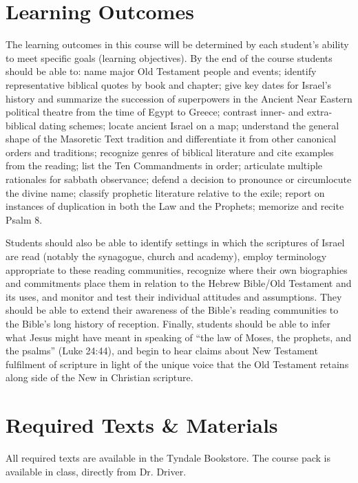 \documentclass[titlepage]{article}
\newcommand\incl{../includes}
\begin{document}


\section{Learning Outcomes}
\label{outcomes}

The learning outcomes in this course will be determined by each
student's ability to meet specific goals (learning objectives). By the
end of the course students should be able to:
  name major Old Testament people and events;
  identify representative biblical quotes by book and chapter;
  give key dates for Israel's history and summarize the succession of
    superpowers in the Ancient Near Eastern political theatre from the
    time of Egypt to Greece;
  contrast inner- and extra-biblical dating schemes;
  locate ancient Israel on a map;
  understand the general shape of the Masoretic Text tradition and
    differentiate it from other canonical orders and traditions;
  recognize genres of biblical literature and cite examples from the
    reading;
  list the Ten Commandments in order;
  articulate multiple rationales for sabbath observance;
  defend a decision to pronounce or circumlocute the divine name;
  classify prophetic literature relative to the exile;
  report on instances of duplication in both the Law and the Prophets;
  memorize and recite Psalm 8.

Students should also be able to identify settings in which the
scriptures of Israel are read (notably the synagogue, church and
academy), employ terminology appropriate to these reading communities,
recognize where their own biographies and commitments place them in
relation to the Hebrew Bible/Old Testament and its uses, and monitor and
test their individual attitudes and assumptions. They should be able
to extend their awareness of the Bible's reading communities to the
Bible's long history of reception. Finally, students should be able to
infer what Jesus might have meant in speaking of ``the law of Moses, the
prophets, and the psalms'' (Luke 24:44), and begin to hear claims about
New Testament fulfilment of scripture in light of the unique voice that
the Old Testament retains along side of the New in Christian scripture.

\section{Required Texts \& Materials}
\label{texts}

All required texts are available in the Tyndale Bookstore. The course
pack is available in class, directly from Dr. Driver.
\end{document}
